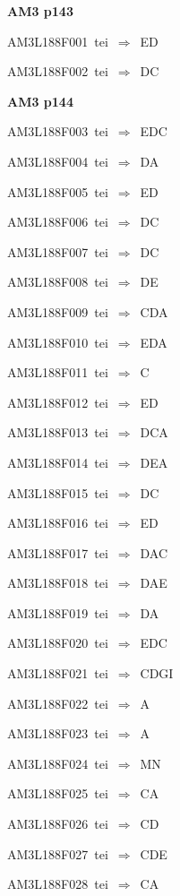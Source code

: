 \par\vfill\eject
{\bf\hfill AM3 p143\hfill\hbox{}}\par\bigskip
{\sixrm AM3L188F001\ {\sixit tei}\ }$\Rightarrow$\ ED\par\smallskip
{\sixrm AM3L188F002\ {\sixit tei}\ }$\Rightarrow$\ DC\par\smallskip

\par\vfill\eject
{\bf\hfill AM3 p144\hfill\hbox{}}\par\bigskip
{\sixrm AM3L188F003\ {\sixit tei}\ }$\Rightarrow$\ EDC\par\smallskip
{\sixrm AM3L188F004\ {\sixit tei}\ }$\Rightarrow$\ DA\par\smallskip
{\sixrm AM3L188F005\ {\sixit tei}\ }$\Rightarrow$\ ED\par\smallskip
{\sixrm AM3L188F006\ {\sixit tei}\ }$\Rightarrow$\ DC\par\smallskip
{\sixrm AM3L188F007\ {\sixit tei}\ }$\Rightarrow$\ DC\par\smallskip
{\sixrm AM3L188F008\ {\sixit tei}\ }$\Rightarrow$\ DE\par\smallskip
{\sixrm AM3L188F009\ {\sixit tei}\ }$\Rightarrow$\ CDA\par\smallskip
{\sixrm AM3L188F010\ {\sixit tei}\ }$\Rightarrow$\ EDA\par\smallskip
{\sixrm AM3L188F011\ {\sixit tei}\ }$\Rightarrow$\ C\par\smallskip
{\sixrm AM3L188F012\ {\sixit tei}\ }$\Rightarrow$\ ED\par\smallskip
{\sixrm AM3L188F013\ {\sixit tei}\ }$\Rightarrow$\ DCA\par\smallskip
{\sixrm AM3L188F014\ {\sixit tei}\ }$\Rightarrow$\ DEA\par\smallskip
{\sixrm AM3L188F015\ {\sixit tei}\ }$\Rightarrow$\ DC\par\smallskip
{\sixrm AM3L188F016\ {\sixit tei}\ }$\Rightarrow$\ ED\par\smallskip
{\sixrm AM3L188F017\ {\sixit tei}\ }$\Rightarrow$\ DAC\par\smallskip
{\sixrm AM3L188F018\ {\sixit tei}\ }$\Rightarrow$\ DAE\par\smallskip
{\sixrm AM3L188F019\ {\sixit tei}\ }$\Rightarrow$\ DA\par\smallskip
{\sixrm AM3L188F020\ {\sixit tei}\ }$\Rightarrow$\ EDC\par\smallskip
{\sixrm AM3L188F021\ {\sixit tei}\ }$\Rightarrow$\ CDGI\par\smallskip
{\sixrm AM3L188F022\ {\sixit tei}\ }$\Rightarrow$\ A\par\smallskip
{\sixrm AM3L188F023\ {\sixit tei}\ }$\Rightarrow$\ A\par\smallskip
{\sixrm AM3L188F024\ {\sixit tei}\ }$\Rightarrow$\ MN\par\smallskip
{\sixrm AM3L188F025\ {\sixit tei}\ }$\Rightarrow$\ CA\par\smallskip
{\sixrm AM3L188F026\ {\sixit tei}\ }$\Rightarrow$\ CD\par\smallskip
{\sixrm AM3L188F027\ {\sixit tei}\ }$\Rightarrow$\ CDE\par\smallskip
{\sixrm AM3L188F028\ {\sixit tei}\ }$\Rightarrow$\ CA\par\smallskip

